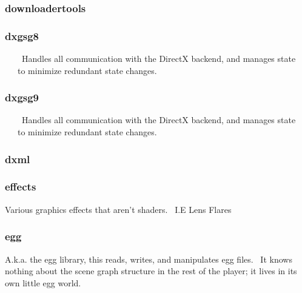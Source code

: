 \documentclass[a4paper]{article}
\begin{document}
\clearpage\subsubsection[downloadertools]{downloadertools}
\hypertarget{RefHeading21331167907073}{}\subsubsection{}
\clearpage\subsubsection[dxgsg8]{dxgsg8}
\hypertarget{RefHeading21351167907073}{}{\color{black}
\ \ \ \ Handles all communication with the DirectX backend, and manages state\newline
 \ \ \ to minimize redundant state changes.}

\clearpage\subsubsection[dxgsg9]{dxgsg9}
\hypertarget{RefHeading21371167907073}{}{\color{black}
\ \ \ \ Handles all communication with the DirectX backend, and manages state\newline
 \ \ \ to minimize redundant state changes.}

\clearpage\subsubsection[dxml]{dxml}
\hypertarget{RefHeading21391167907073}{}\subsubsection{}
\clearpage\subsubsection[effects]{effects}
\hypertarget{RefHeading21411167907073}{}{\color{black}
Various graphics effects that aren't shaders. \ I.E Lens Flares}

\clearpage\subsubsection[egg]{egg}
\hypertarget{RefHeading21431167907073}{}{\color{black}
A.k.a. the {\textquotedbl}egg library{\textquotedbl}, this reads, writes, and manipulates egg files. \ It knows nothing
about the scene graph structure in the rest of the player; it lives in its own little egg world.}
\end{document}
